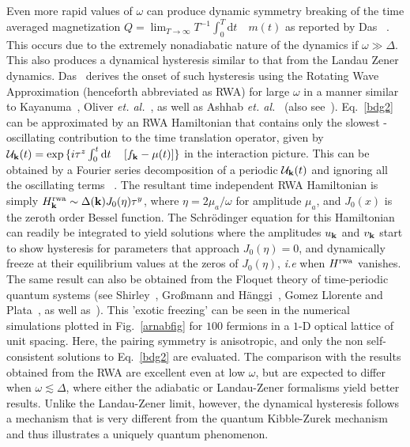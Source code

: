 \documentclass[aps,pra,floats,epsfig,pdflatex]{revtex4}                                                              %
\begin{document}
 {Even more rapid values of $\omega$ can produce dynamic symmetry breaking of the time averaged magnetization $Q=\lim_{T\rightarrow\infty}T^{-1}\int^T_0 \mathrm{d}t \quad m(t)$ as reported by Das}~\cite{arnab1} {. This occurs due to the extremely nonadiabatic nature of the dynamics if $\omega\gg\Delta$. This also produces a dynamical hysteresis similar to that from the Landau Zener dynamics. Das}~\cite{arnab1}  {derives the onset of such hysteresis using the Rotating Wave Approximation (henceforth abbreviated as RWA) for large $\omega$ in a manner similar to Kayanuma~\cite{kayanuma:rwa}, Oliver \textit{et. al.}}~\cite{oliver}, as well as Ashhab \textit{et. al.}~\cite{rwa} (also see~\cite{review:lzstls}). Eq.~\ref{bdg2}  {can be approximated by an RWA Hamiltonian that contains only the slowest - oscillating contribution to the time translation operator, given by $\mathcal{U}_{\bf k}(t)=\exp{\{i\tau^z\int^t_0 \mathrm{d}t\quad\left[f_{\bf k}-\mu(t)\right]\}}$ in the interaction picture. This can be obtained by 
a Fourier series decomposition of a periodic $\mathcal{U}_{\bf k}(t)$ and ignoring all the oscillating terms}~\cite{arnab1} {. The resultant time independent RWA Hamiltonian is simply $H^{\rm rwa}_{\bf k}\sim\Delta({\bf k})J_0(\eta)\tau^y$, where $\eta=2\mu_a/\omega$ for amplitude $\mu_a$, and $J_0(x)$ is the zeroth order Bessel function. The Schr\"odinger equation for this Hamiltonian can readily be integrated to yield solutions where the amplitudes $u_{\bf k}$ and $v_{\bf k}$ start to show hysteresis for 
parameters that approach $J_0(\eta)=0$, and dynamically freeze at their equilibrium values at the zeros of $J_0(\eta)$, \textit{i.e} when  $H^{\rm rwa}$ vanishes. The same result can also be obtained from the Floquet theory of time-periodic quantum systems  (see Shirley~\cite{shirley}, Gro\ss mann and H\"anggi~\cite{grossman:hanggi}, Gomez Llorente and Plata~\cite{gomez:floquet}, as well as~\cite{review:lzstls}). This 'exotic freezing' can be seen in the numerical simulations plotted in Fig.}~\ref{arnabfig} { for $100$ fermions in a $1$-D optical lattice of unit spacing. Here, the pairing symmetry is anisotropic, and only the non self-consistent solutions to Eq.}~\ref{bdg2}  {are evaluated. The comparison with the results obtained from the RWA are excellent even at low $\omega$, but are expected to differ when $\omega\lesssim\Delta$, where either the adiabatic or Landau-Zener formalisms yield better results. Unlike the Landau-Zener limit, however, the dynamical hysteresis follows a mechanism that is very 
different from the quantum Kibble-Zurek mechanism}~\cite{arnab1}  {and thus illustrates a uniquely quantum phenomenon.}
\end{document}
